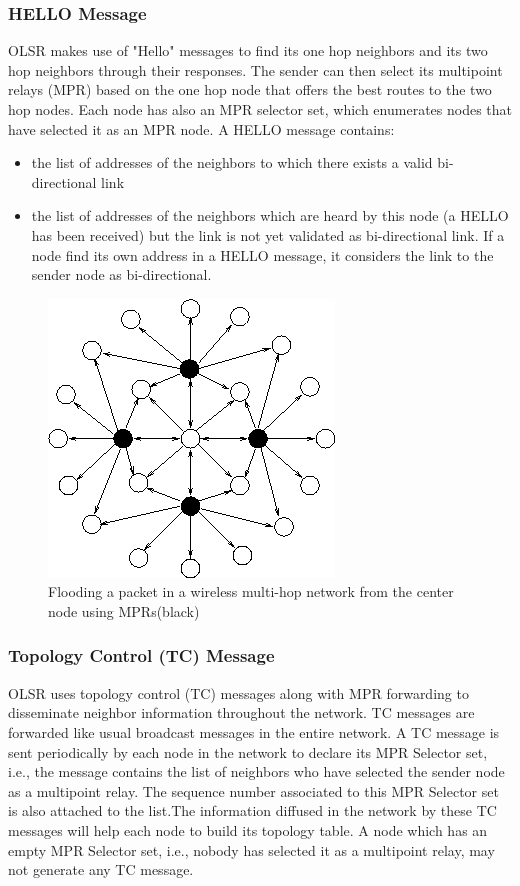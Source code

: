\documentclass[12pt,a4paper]{report}
\begin{document}
\subsubsection{HELLO Message}
OLSR makes use of "Hello" messages to find its one hop neighbors and its two hop neighbors through their responses. The sender can then select its multipoint relays (MPR) based on the one hop node that offers the best routes to the two hop nodes. Each node has also an MPR selector set, which enumerates nodes that have selected it as an MPR node. A HELLO message contains:
\begin{itemize}
\item the list of addresses of the neighbors to which there exists a valid bi-directional link
\item the list of addresses of the neighbors which are heard by this node (a HELLO has been received) but the link is not yet validated as bi-directional link. If a node find its own address in a HELLO message, it considers the link to the sender node as bi-directional.
\end{itemize}

\begin{figure}[hbtp]
\centering
\includegraphics[scale=.5]{mpr.png}
\caption{Flooding a packet in a wireless multi-hop network from the center node using MPRs(black)}
\end{figure}


\subsubsection{Topology Control (TC) Message}
OLSR uses topology control (TC) messages along with MPR forwarding to disseminate neighbor information throughout the network. TC messages are forwarded like usual broadcast messages in the entire network. A TC message is sent periodically by each node in the network to declare its MPR Selector set, i.e., the message contains the list of neighbors who have selected the sender node as a multipoint relay. The sequence number associated to this MPR Selector set is also attached to the list.The information diffused in the network by these TC messages will help each node to build its topology table. A node which has an empty MPR Selector set, i.e., nobody has selected it as a multipoint relay, may not generate any TC message.
\end{document}
